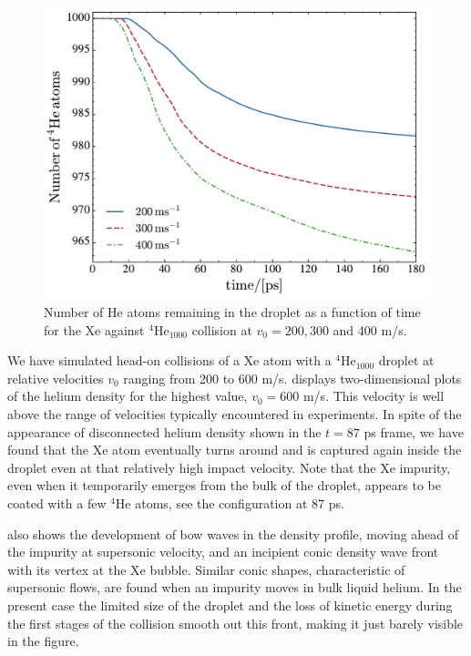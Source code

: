 %
\begin{figure}[!]
\centerline{\includegraphics[width=0.9\linewidth,clip]{nparticles}}
\caption{\label{fig4-capture} 
Number of He atoms remaining in the droplet as a function of time for the
Xe against $^4$He$_{1000}$ collision at $v_0 = 200, 300$ and 400 m/s.
}
\end{figure}

We have simulated head-on collisions of a Xe atom with a
$^4$He$_{1000}$ droplet at relative velocities $v_0$ 
ranging from 200 to 600 m/s.  
displays two-dimensional plots of the helium density 
for the highest value, $v_0= 600$ m/s. This velocity is 
well above the range of velocities typically encountered
in experiments\citep{Gom11,Gom14,Jones2016}.  
In spite of the appearance of disconnected helium density shown in the 
$t= 87$ ps frame, we have found that the Xe atom eventually 
turns around and is 
captured again inside the droplet even at that relatively high impact velocity. 
Note that the Xe impurity, even when it temporarily emerges from the bulk of the 
droplet, appears to be coated with a few
$^4$He atoms, see the configuration at 87 ps.

  also shows the development of bow waves in the density profile, moving 
ahead of the impurity at 
supersonic velocity, and
an incipient  conic  density wave front  with its vertex at the Xe bubble.
Similar conic shapes, characteristic of supersonic flows, 
are found when an impurity moves in bulk liquid helium. 
In the present case the limited size of the droplet and 
the loss of kinetic energy
during the first stages of the collision
smooth out this front, making it just barely visible in the figure.

